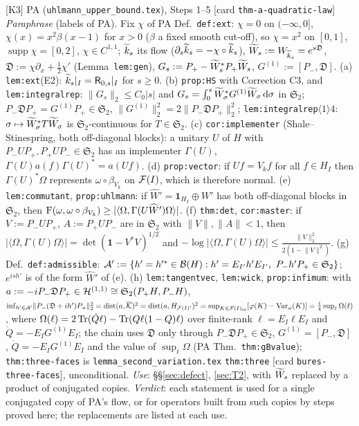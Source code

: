 \documentclass[11pt]{article}
\newcommand{\Pp}{P_+}\newcommand{\Pm}{P_-}\newcommand{\Stwo}{\mathfrak S_2}\newcommand{\Sone}{\mathfrak S_1}
\newcommand{\norm}[1]{\lVert#1\rVert}\newcommand{\abs}[1]{\lvert#1\rvert}\newcommand{\ip}[2]{\langle#1,#2\rangle}
\newcommand{\one}{\mathbf 1}\newcommand{\Om}{\Omega}\newcommand{\Gh}{\widehat G}\newcommand{\Dc}{\mathfrak D}
\DeclareMathOperator{\dist}{dist}\DeclareMathOperator{\artanh}{artanh}\DeclareMathOperator{\Ran}{Ran}
\theoremstyle{definition}\newtheorem{hypothesis}[theorem]{Hypothesis}
\begin{document}
\begin{citedbox}{[K3] PA (\texttt{uhlmann\_upper\_bound.tex}), Steps 1--5 [card \texttt{thm-a-quadratic-law}]}
\emph{Paraphrase} (labels of PA).  Fix $\chi$ of PA Def.~\texttt{def:ext}: $\chi=0$ on $(-\infty,0]$,
$\chi(x)=x^2\beta(x-1)$ for $x>0$ ($\beta$ a fixed smooth cut-off), so $\chi=x^2$ on $[0,1]$,
$\operatorname{supp}\chi=[0,2]$, $\chi\in C^{1,1}$; $\widetilde k_s$ its flow ($\partial_s\widetilde k_s=-\chi\circ\widetilde k_s$),
$\Wt_s:=W_{\kt_s}=e^{s\Dc}$, $\Dc:=\chi\partial_x+\frac12\chi'$ (Lemma~\texttt{lem:gen}), $G_s:=\Pp-\Wt_s^*\Pp
\Wt_s$, $G^{(1)}:=[\Pm,\Dc]$.  (a) \texttt{lem:ext}(E2): $\widetilde k_s|_I=\mathsf R_{0,s}|_I$ for $s\ge0$.  (b)
\texttt{prop:HS} with Correction C3, and \texttt{lem:integralrep}: $\norm{G_s}_2\le C_0\abs s$ and
$G_s=\int_0^s\widetilde W_\sigma^*G^{(1)}\widetilde W_\sigma\,\mathrm d\sigma$ in $\Stwo$; $\Pm\Dc\Pp=G^{(1)}\Pp\in\Stwo$,
$\norm{G^{(1)}}_2^2=2\norm{\Pm\Dc\Pp}_2^2$; \texttt{lem:integralrep}$\langle1\rangle4$:
$\sigma\mapsto\widetilde W^*_\sigma T\widetilde W_\sigma$ is $\Stwo$-continuous for $T\in\Stwo$.  (c) \texttt{cor:implementer}
(Shale--Stinespring, both off-diagonal blocks): a unitary $U$ of $H$ with $\Pm U\Pp,\Pp U\Pm\in\Stwo$ has an
implementer $\Gamma(U)$, $\Gamma(U)a(f)\Gamma(U)^*=a(Uf)$.  (d) \texttt{prop:vector}: if $U f=V_kf$ for all
$f\in H_I$ then $\Gamma(U)^*\Om$ represents $\omega\circ\beta_{V_k}$ on $\mathcal F(I)$, which is therefore normal.
(e) \texttt{lem:commutant}, \texttt{prop:uhlmann}: if $\widehat W'=\one_{H_I}\oplus W'$ has both off-diagonal
blocks in $\Stwo$, then $\Fid(\omega,\omega\circ\beta_{V_k})\ge\abs{\ip\Om{\Gamma(U\widehat W')\Om}}$.  (f)
\texttt{thm:det}, \texttt{cor:master}: if $V:=\Pm U\Pp$, $A:=\Pp U\Pm$ are in $\Stwo$ with $\norm V,\norm
A<1$, then $\abs{\ip\Om{\Gamma(U)\Om}}=\det(\one-V^*V)^{1/2}$ and $-\log\abs{\ip\Om{\Gamma(U)\Om}}\le
\frac{\norm V_2^2}{2(1-\norm V^2)}$.  (g) Def.~\texttt{def:admissible}: $\mathcal A':=\{h'=h'^*\in\cB(H):
h'=E_{I'}h'E_{I'},\ \Pm h'\Pp\in\Stwo\}$; $e^{ish'}$ is of the form $\widehat W'$ of (e).  (h)
\texttt{lem:tangentvec}, \texttt{lem:wick}, \texttt{prop:infimum}: with $a:=-i\Pm\Dc\Pp\in\Hil^{(1,1)}
\cong\Stwo(\Pp H,\Pm H)$, $\inf_{h'\in\mathcal A'}\norm{\Pm(\Dc+ih')\Pp}_2^2=\dist(a,\overline{\mathcal K})^2
=\dist(a,H_{\cF(I)'})^2=\sup_{K\in\cF(I)_{\rm sa}}[\varphi(K)-\mathrm{Var}_\omega(K)]
=\frac14\sup_\ell\Omega(\ell)$, where $\Omega(\ell)=2\operatorname{Tr}(\dot Q\ell)-\operatorname{Tr}(Q\ell(1-Q)\ell)$ over finite-rank
$\ell=E_I\ell E_I$ and $\dot Q=-E_IG^{(1)}E_I$; the chain uses $\Dc$ only through $\Pm\Dc\Pp\in\Stwo$,
$G^{(1)}=[\Pm,\Dc]$, $\dot Q=-E_IG^{(1)}E_I$ and the value of $\sup_\ell\Omega$ (PA
Thm.~\texttt{thm:gBvalue}); \texttt{thm:three-faces} is \texttt{lemma\_second\_variation.tex}
\texttt{thm:three} [card \texttt{bures-three-faces}], unconditional.  \emph{Use}: \S\S\ref{sec:defect},
\ref{sec:T2}, with $\widetilde W_s$ replaced by a product of conjugated copies.  \emph{Verdict}: each statement is
used for a single conjugated copy of PA's flow, or for operators built from such copies by steps proved
here; the replacements are listed at each use.
\end{citedbox}
\end{document}
